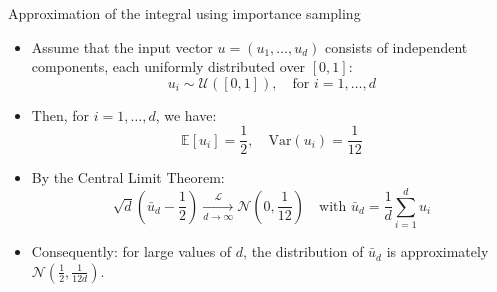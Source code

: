 \documentclass[aspectratio=169,xcolor=dvipsnames]{beamer}
\begin{document}
    \begin{frame}{Approximation of the integral using importance sampling}
    \begin{itemize}
            \item<1-> Assume that the input vector \( u = (u_1, \dots, u_d) \) consists of independent components, each uniformly distributed over \([0,1]\):
        \[
        u_i \sim \mathcal{U}([0, 1]), \quad \text{for } i = 1, \dots, d
        \]
        
        \bigskip
        \item<2->Then, for \( i = 1, \dots, d \), we have:
        \[
        \mathbb{E}[u_i] = \frac{1}{2}, \quad \mathrm{Var}(u_i) = \frac{1}{12}
        \]
        
        \item<3->By the Central Limit Theorem:
        \[
        \sqrt{d} \left( \bar{u}_d - \frac{1}{2} \right) \xrightarrow[d \to \infty]{\mathcal{L}} \mathcal{N}\left(0, \frac{1}{12}\right)
        \quad \text{with } \bar{u}_d = \frac{1}{d} \sum_{i=1}^d u_i
        \]

        \item<4->Consequently: for large values of $d$, the distribution of $\bar{u}_d$ is approximately $\mathcal{N}\left( \frac{1}{2}, \frac{1}{12d} \right)$.
        \end{itemize}
    \end{frame}
    
\end{document}
